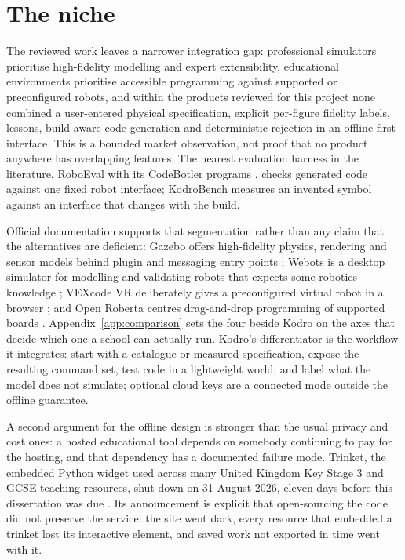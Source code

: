 \documentclass[11pt,a4paper]{report}
\begin{document}
\section{The niche}
\label{sec:niche}
 The reviewed work leaves a narrower integration gap: professional simulators prioritise high-fidelity modelling and expert extensibility, educational environments prioritise accessible programming against supported or preconfigured robots, and within the products reviewed for this project none combined a user-entered physical specification, explicit per-figure fidelity labels, lessons, build-aware code generation and deterministic rejection in an offline-first interface. This is a bounded market observation, not proof that no product anywhere has overlapping features. The nearest evaluation harness in the literature, RoboEval with its CodeBotler programs \citep{hu2023}, checks generated code against one fixed robot interface; KodroBench measures an invented symbol against an interface that changes with the build.

 Official documentation supports that segmentation rather than any claim that the alternatives are deficient: Gazebo offers high-fidelity physics, rendering and sensor models behind plugin and messaging entry points \citep{gazebo2026}; Webots is a desktop simulator for modelling and validating robots that expects some robotics knowledge \citep{webots2026}; VEXcode VR deliberately gives a preconfigured virtual robot in a browser \citep{vex2026}; and Open Roberta centres drag-and-drop programming of supported boards \citep{openroberta2026}. Appendix~\ref{app:comparison} sets the four beside Kodro on the axes that decide which one a school can actually run. Kodro's differentiator is the workflow it integrates: start with a catalogue or measured specification, expose the resulting command set, test code in a lightweight world, and label what the model does not simulate; optional cloud keys are a connected mode outside the offline guarantee.

A second argument for the offline design is stronger than the usual privacy and cost ones: a hosted educational tool depends on somebody continuing to pay for the hosting, and that dependency has a documented failure mode. Trinket, the embedded Python widget used across many United Kingdom Key Stage 3 and GCSE teaching resources, shut down on 31 August 2026, eleven days before this dissertation was due \citep{trinket2026}. Its announcement is explicit that open-sourcing the code did not preserve the service: the site went dark, every resource that embedded a trinket lost its interactive element, and saved work not exported in time went with it.
\end{document}
